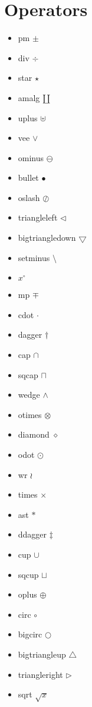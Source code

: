 \documentclass[11pt]{article}  %
\begin{document}
\section*{Operators}
\begin{itemize}
\item pm $\pm$
\item div $\div$
\item star $\star$
\item amalg $\amalg$
\item uplus $\uplus$
\item vee $\vee$
\item ominus $\ominus$
\item bullet $\bullet$
\item oslash $\oslash$
\item triangleleft $\triangleleft$
\item bigtriangledown $\bigtriangledown$
\item setminus $\setminus$
\item $x^{\circ}$
\item mp $\mp$
\item cdot $\cdot$
\item dagger $\dagger$
\item cap $\cap$
\item sqcap $\sqcap$
\item wedge $\wedge$
\item otimes $\otimes$
\item diamond $\diamond$
\item odot $\odot$
\item wr $\wr$
\item times $\times$
\item ast $\ast$
\item ddagger $\ddagger$
\item cup $\cup$
\item sqcup $\sqcup$
\item oplus $\oplus$
\item circ $\circ$
\item bigcirc $\bigcirc$
\item bigtriangleup $\bigtriangleup$
\item triangleright $\triangleright$
\item sqrt $\sqrt{x}$
\end{itemize}
\end{document}
